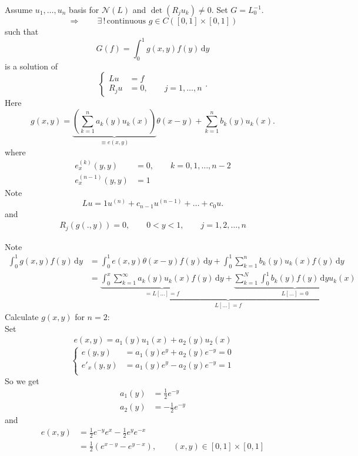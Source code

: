\begin{theorem}
	Assume $u_1, \dots,u_n$ basis for $\mathcal{N}(L)$ and $\det(R_ju_k) \neq 0$. Set $G=L_0^{-1}$. \[
		\Rightarrow \qquad \exists\,!\, \text{continuous }g \in C([0,1] \times [0,1])
	\]
	such that
	\[
		G(f) = \int_{0}^{1}g(x,y)f(y) \,\mathrm{d}y
	\] is a solution of
	\[
		\begin{cases}
			Lu &= f \\
			R_ju &=0, \qquad j=1,\dots,n
		\end{cases}.
	\]
	Here 
	\[
		g(x,y)= \underset{\equiv e(x,y)}{\underbrace{\left( \sum_{k=1}^{n}a_k(y)u_k(x) \right)}} \theta(x-y)+ \sum_{k=1}^{n}b_k(y)u_k(x).
	\]
	where
	\begin{align*}
		e^{(k)}_x (y,y) &= 0, \qquad k = 0,1,\dots,n-2 \\
		e^{(n-1)}_x(y,y) &=1
	\end{align*}
	Note
	\[
		Lu = 1 u^{(n)} + c_{n-1}u^{(n-1)} + \dots + c_0 u.
	\]
	and 
	\begin{align*}
		R_j(g(.,y)) = 0, \qquad 0 < y < 1, \qquad j=1,2,\dots,n
	\end{align*}
\end{theorem}
Note 
\begin{align*}
	\int_{0}^{1}g(x,y)f(y) \,\mathrm{d}y &= \int_{0}^{1}e(x,y) \theta(x-y)f(y) \,\mathrm{d}y + \int_{0}^{1} \sum_{k=1}^{n} b_k(y)u_k(x)f(y) \,\mathrm{d}y \\
	&= \underset{L[...]=f}{\underbrace{\underset{=L [...] = f}{\underbrace{\int_{0}^{x}\sum_{k=1}^{\infty}a_k(y)u_k(x) f(y) \,\mathrm{d}y}} + \underset{L[...]= 0}{\underbrace{\sum_{k=1}^{N} \int_{0}^{1}b_k(y)f(y) \,\mathrm{d}y u_k(x)}}}}
\end{align*}
Calculate $g(x,y)$ for $n=2$: \\
Set \begin{align*}
	e(x,y) = a_1(y)u_1(x)+ a_2(y)u_2(x)
\end{align*}
\[
	\begin{cases}
		e(y,y) &= a_1(y)e^y + a_2(y)e^{-y} = 0 \\
		e'_x(y,y) &= a_1(y)e^y - a_2(y) e^{-y}=1 \\
	\end{cases}
\]
So we get
\begin{align*}
	a_1(y) &= \frac{1}{2} e^{-y} \\
	a_2(y) &= - \frac{1}{2} e^{-y}
\end{align*}
and
\begin{align*} 
	e(x,y) &= \frac{1}{2} e^{-y} e^x - \frac{1}{2} e^{y}e^{-x}  \\
	&= \frac{1}{2} (e^{x-y} - e^{y-x}), \qquad (x,y) \in [0,1] \times [0,1]
\end{align*}
